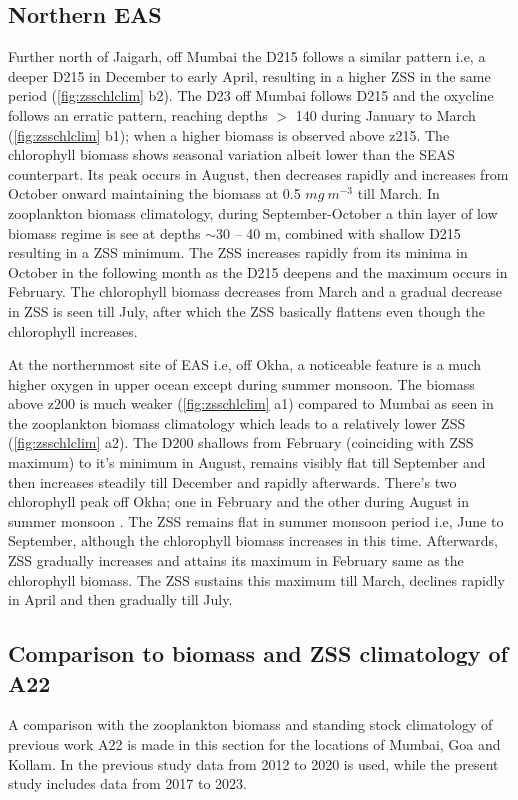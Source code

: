 \documentclass{article}
\begin{document}
	\subsection{Northern EAS}
	Further north of Jaigarh, off Mumbai the D215 follows a similar pattern i.e, a deeper D215 in December to early April, resulting in a higher ZSS in the same period (\cref{fig:zsschlclim} b2). The D23 off Mumbai follows D215 and the oxycline follows an erratic pattern, reaching depths $>$ 140 during January to March (\cref{fig:zsschlclim} b1); when a higher biomass is observed above z215. The chlorophyll biomass shows seasonal variation albeit lower than the SEAS counterpart. Its peak occurs in August, then decreases rapidly and increases from October onward maintaining the biomass at 0.5 $mg\ m^{-3}$ till March. In zooplankton biomass climatology, during September-October a thin layer of low biomass regime is see at depths $\sim$30 -- 40 m, combined with shallow D215 resulting in a ZSS minimum. The ZSS increases rapidly from its minima in October in the following month as the D215 deepens and the maximum occurs in February. The chlorophyll biomass decreases from March and a gradual decrease in ZSS is seen till July, after which the ZSS basically flattens even though the chlorophyll increases. 
	
	At the northernmost site of EAS i.e, off Okha, a noticeable feature is a much higher oxygen in upper ocean except during summer monsoon. The biomass above z200 is much weaker (\cref{fig:zsschlclim} a1) compared to Mumbai as seen in the zooplankton biomass climatology which leads to a relatively lower ZSS (\cref{fig:zsschlclim} a2). The D200 shallows from February (coinciding with ZSS maximum) to it's minimum in August,  remains visibly flat till September and then increases steadily till December and rapidly afterwards. There's two chlorophyll peak off Okha; one in February \citep{keerthi2017physical} and the other during August in summer monsoon \citep{levy2007basin}. The ZSS remains flat in summer monsoon period i.e, June to September, although the chlorophyll biomass increases in this time. Afterwards, ZSS gradually increases and attains its maximum in February same as the chlorophyll biomass. The ZSS sustains this maximum till March, declines rapidly in April and then gradually till July.
	 
	\subsection{Comparison to biomass and ZSS climatology of A22}	 
	A comparison with the zooplankton biomass and standing stock climatology of previous work A22 is made in this section for the locations of Mumbai, Goa and Kollam. In the previous study data from 2012 to 2020 is used, while the present study includes data from 2017 to 2023.
	
\end{document}
